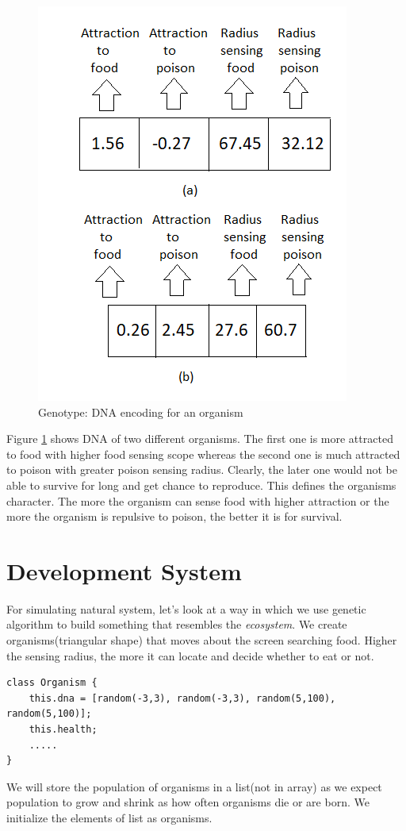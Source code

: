 \documentclass[conference]{IEEEtran}
\begin{document}
\begin{figure}
	\includegraphics[scale=1]{genotype.png}
	\caption{Genotype: DNA encoding for an organism}
	\label{fig:genotype}
\end{figure}
Figure \ref{fig:genotype} shows DNA of two different organisms. The first one is more attracted to food with higher food sensing scope whereas the second one is much attracted to poison with greater poison sensing radius. Clearly, the later one would not be able to survive for long and get chance to reproduce. This defines the organisms character. The more the organism can sense food with higher attraction or the more the organism is repulsive to poison, the better it is for survival.

\section{Development System}
For simulating natural system, let's look at a way in which we use genetic algorithm to build something that resembles the \textit{ecosystem}. We create organisms(triangular shape) that moves about the screen searching food. Higher the sensing radius, the more it can locate and decide whether to eat or not.

\begin{lstlisting}[caption = DNA of Organism]
class Organism {
	this.dna = [random(-3,3), random(-3,3), random(5,100), random(5,100)];
	this.health;
	.....
}
\end{lstlisting}
We will store the population of organisms in a list(not in array) as we expect population to grow and shrink as how often organisms die or are born. We initialize the elements of list as organisms.
\end{document}
